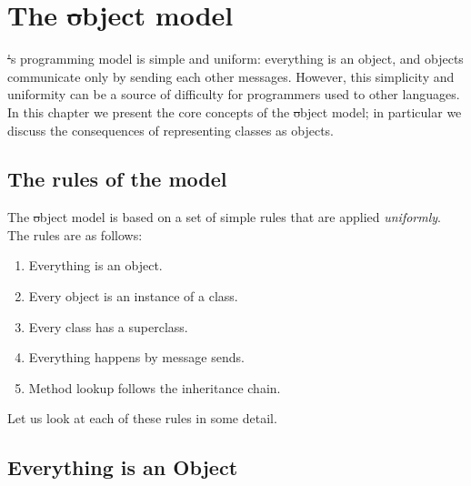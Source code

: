 \documentclass[a4paper,10pt,twoside]{book}
\begin{document}
	\renewcommand{\nnbb}[2]{} %
	\sloppy
\fi
\chapter{The \st object model}
\label{cha:SqueakModel}\label{cha:model}

\st's programming model is simple and uniform: everything is an object, and objects communicate only by sending each other messages.
However, this simplicity and uniformity can be a source of difficulty for programmers used to other languages. In this chapter we present the core concepts of the \st object model; in particular we discuss the consequences of representing classes as objects.

\section{The rules of the model}
\label{sec:rules}

The \st object model is based on a set of simple 
rules that are applied \emph{uniformly}. The rules are as follows:

\begin{enumerate}[label={\textbf{Rule \arabic{*}}.}, ref={Rule \arabic{*}}, leftmargin=*]
\item{} \label{rule:everything}
	Everything is an object.

\item{} \label{rule:instance}
	Every object is an instance of a class.

\item{}  \label{rule:inheritance}
	Every class has a superclass.

\item{}  \label{rule:message}
	Everything happens by message sends.

\item{}  \label{rule:lookup}
	Method lookup follows the inheritance chain.

\end{enumerate}

\noindent
Let us look at each of these rules in some detail.


\section{Everything is an Object}
\end{document}
